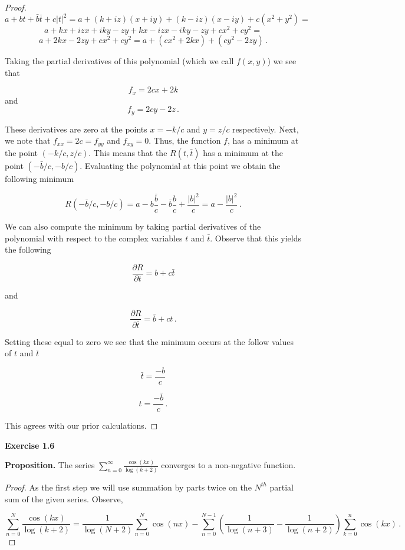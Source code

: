 \documentclass[a4paper]{article}
\numberwithin{equation}{section}
\begin{document}
\begin{description}
\begin{proof}
$$a + bt + \bar{b}\bar{t} + c|t|^2 = a + (k + iz)(x + iy) + (k-iz)(x-iy) + c(x^2+y^2) = $$
$$a + kx + izx +iky - zy + kx - izx - iky - zy + cx^2 + cy^2 = $$
$$a + 2kx - 2zy + cx^2 + cy^2 = a + (cx^2 + 2kx) + (cy^2 - 2zy)\,.$$

Taking the partial derivatives of this polynomial (which we call $f(x,y)$) we see that

$$f_x = 2cx + 2k$$
and
$$f_y = 2cy - 2z\,.$$

These derivatives are zero at the points $x = -k/c$
and $y = z/c$ respectively. Next, we note that $f_{xx} = 2c = f_{yy}$ and $f_{xy} = 0$. Thus, the function $f$, has a minimum at the point $(-k/c,z/c)$. This means that the $R(t,\bar{t})$ has a minimum at the point $(-\bar{b}/c,-b/c)$. Evaluating the polynomial at this point we obtain the following minimum

$$R(-\bar{b}/c,-b/c) = a - b\frac{\bar{b}}{c} - \bar{b}\frac{b}{c} + \frac{|b|^2}{c} = a - \frac{|b|^2}{c}\,.$$

We can also compute the minimum by taking partial derivatives of the polynomial with respect to the complex variables $t$ and $\bar{t}$. Observe that this yields the following

$$\frac{\partial R}{\partial t} = b + c\bar{t}$$

and

$$\frac{\partial R}{\partial \bar{t}} = \bar{b} +ct\,.$$

Setting these equal to zero we see that the minimum occurs at the follow values of $t$ and $\bar{t}$

$$\bar{t} = \frac{-b}{c}$$

$$t = \frac{-\bar{b}}{c}\,.$$

This agrees with our prior calculations.

\end{proof}

\item \textbf{Exercise 1.6}

\item \textbf{Proposition.} The series $\sum \limits_{n=0}^\infty\frac{\cos(kx)}{\log(k+2)}$ converges to a non-negative function.

\item\begin{proof} As the first step we will use summation by parts twice on the $N^{th}$ partial sum of the given series. Observe,

$$\sum \limits_{n=0}^N\frac{\cos(kx)}{\log(k+2)} = \frac{1}{\log(N+2)}\sum \limits_{n=0}^N\cos(nx) - \sum \limits_{n=0}^{N-1}\left( \frac{1}{\log(n+3)} -\frac{1}{\log(n+2)} \right)\sum \limits_{k=0}^{n}\cos(kx)\,.$$


\end{proof}
\end{description}
\end{document}
